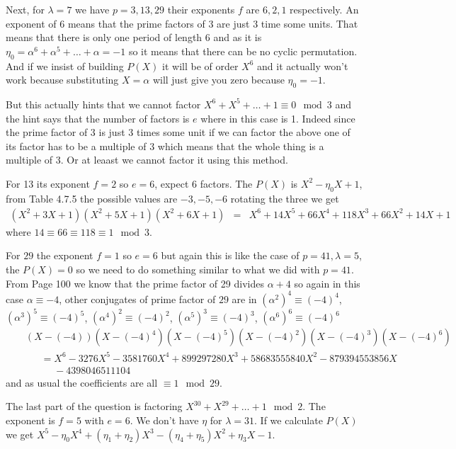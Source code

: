 \documentclass[aps,preprint,preprintnumbers,nofootinbib,showpacs,prd]{revtex4-1}
\newcommand{\nbea}{\begin{eqnarray*}}
\newcommand{\neea}{\end{eqnarray*}}
\begin{document}
Next, for $\lambda = 7$ we have $p = 3, 13, 29$ their exponents $f$ are $6, 2, 1$ respectively. An exponent of $6$ means that the prime factors of $3$ are just $3$ time some units. That means that there is only one period of length 6 and as it is $\eta_0 = \alpha^6 + \alpha^5 + \dots + \alpha = -1$ so it means that there can be no cyclic permutation. And if we insist of building $P(X)$ it will be of order $X^6$ and it actually won't work because substituting $X=\alpha$ will just give you zero because $\eta_0 = -1$.

But this actually hints that we cannot factor $X^6 + X^5 + \dots + 1 \equiv 0 \mod{3}$ and the hint says that the number of factors is $e$ where in this case is 1. Indeed since the prime factor of 3 is just 3 times some unit if we can factor the above one of its factor has to be a multiple of 3 which means that the whole thing is a multiple of 3. Or at leaast we cannot factor it using this method.

For 13 its exponent $f = 2$ so $e = 6$, expect 6 factors. The $P(X)$ is $X^2 - \eta_0X + 1$, from Table 4.7.5 the possible values are $-3, -5, -6$ rotating the three we get
%
\nbea
(X^2 + 3X + 1)(X^2 + 5X + 1)(X^2 + 6X + 1) & = & X^6+14X^5+66X^4+118X^3+66X^2+14X+1
\neea
%
where $14\equiv66\equiv118\equiv1\mod{3}$.

For $29$ the exponent $f=1$ so $e = 6$ but again this is like the case of $p = 41, \lambda = 5$, the $P(X) = 0$ so we need to do something similar to what we did with $p = 41$. From Page 100 we know that the prime factor of 29 divides $\alpha + 4$ so again in this case $\alpha \equiv -4$, other conjugates of prime factor of $29$ are in $(\alpha^2)^4 \equiv (-4)^4$, $(\alpha^3)^5 \equiv (-4)^5$, $(\alpha^4)^2 \equiv (-4)^2$, $(\alpha^5)^3 \equiv (-4)^3$, $(\alpha^6)^6 \equiv (-4)^6$
%
\nbea
&& (X-(-4))(X-(-4)^4)(X-(-4)^5)(X-(-4)^2)(X-(-4)^3)(X-(-4)^6) \\
&& ~~~~~~~ = X^6-3276X^5-3581760X^4+899297280X^3+58683555840X^2-879394553856X \\
&& ~~~~~~~~~~~~~-4398046511104
\neea
%
and as usual the coefficients are all $\equiv 1 \mod{29}$.

The last part of the question is factoring $X^{30} + X^{29} + \dots + 1 \mod{2}$. The exponent is $f = 5$ with $e = 6$. We don't have $\eta$ for $\lambda = 31$. If we calculate $P(X)$ we get $X^5 - \eta_0 X^4 + (\eta_1 + \eta_2) X^3 -(\eta_4 + \eta_5)X^2 +\eta_3X - 1$.
\end{document}
